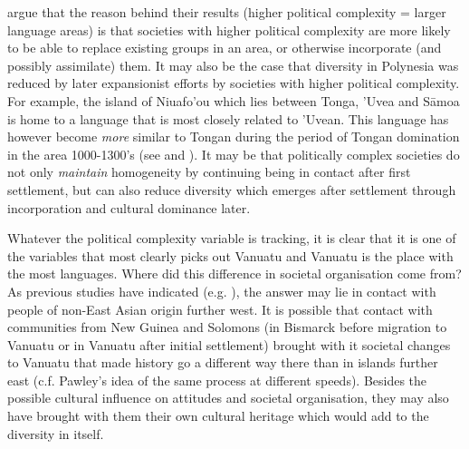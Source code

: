 \documentclass[unnumsec,webpdf,modern,medium]{oup-authoring-template}
\begin{document}
\citet{curriemace2009} argue that the reason behind their results (higher political complexity = larger language areas) is that societies with higher political complexity are more likely to be able to replace existing groups in an area, or otherwise incorporate (and possibly assimilate) them. It may also be the case that diversity in Polynesia was reduced by later expansionist efforts by societies with higher political complexity. For example, the island of Niuafo'ou which lies between Tonga, 'Uvea and S\={a}moa is home to a language that is most closely related to 'Uvean. This language has however become \emph{more} similar to Tongan during the period of Tongan domination in the area 1000-1300's (see \citet{aswani1998tongan} and \citep[2-9]{tuskamoto_niuafoou}). It may be that politically complex societies do not only \emph{maintain} homogeneity by continuing being in contact after first settlement, but can also reduce diversity which emerges after settlement through incorporation and cultural dominance later.

Whatever the political complexity variable is tracking, it is clear that it is one of the variables that most clearly picks out Vanuatu and Vanuatu is the place with the most languages. Where did this difference in societal organisation come from? As previous studies have indicated (e.g. \citet{lynch1981melanesian}), the answer may lie in contact with people of non-East Asian origin further west. It is possible that contact with communities from New Guinea and Solomons (in Bismarck before migration to Vanuatu or in Vanuatu after initial settlement) brought with it societal changes to Vanuatu that made history go a different way there than in islands further east (c.f. Pawley's idea of the same process at different speeds). Besides the possible cultural influence on attitudes and societal organisation, they may also have brought with them their own cultural heritage which would add to the diversity in itself.


\end{document}
